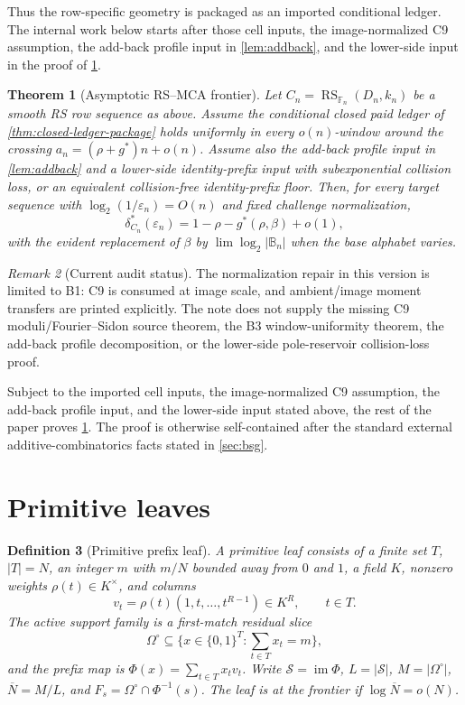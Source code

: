 \documentclass[11pt,a4paper]{amsart}
\numberwithin{equation}{section}
\newtheorem{theorem}{Theorem}[section]
\newtheorem{definition}[theorem]{Definition}
\theoremstyle{remark}
\newtheorem{remark}[theorem]{Remark}
\DeclareMathOperator{\RS}{RS}
\newcommand{\F}{\mathbb F}
\newcommand{\B}{\mathbb B}
\newcommand{\Scal}{\mathcal S}
\newcommand{\OmegaC}{\Omega^{\circ}}
\newcommand{\barN}{\overline N}
\newcommand{\eps}{\varepsilon}
\begin{document}
Thus the row-specific geometry is packaged as an imported conditional ledger.  The internal work below starts after those cell inputs, the image-normalized C9 assumption, the add-back profile input in \cref{lem:addback}, and the lower-side input in the proof of \cref{thm:frontier}.

\begin{theorem}[Asymptotic RS--MCA frontier]\label{thm:frontier}
Let \(C_n=\RS_{\F_n}(D_n,k_n)\) be a smooth RS row sequence as above.  Assume the conditional closed paid ledger of \cref{thm:closed-ledger-package} holds uniformly in every \(o(n)\)-window around the crossing \(a_n=(\rho+g^*)n+o(n)\).  Assume also the add-back profile input in \cref{lem:addback} and a lower-side identity-prefix input with subexponential collision loss, or an equivalent collision-free identity-prefix floor.  Then, for every target sequence with \(\log_2(1/\eps_n)=O(n)\) and fixed challenge normalization,
\[
        \delta_{C_n}^*(\eps_n)
        =1-\rho-g^*(\rho,\beta)+o(1),
\]
with the evident replacement of \(\beta\) by \(\lim\log_2|\B_n|\) when the base alphabet varies.
\end{theorem}

\begin{remark}[Current audit status]\label{rem:current-audit-status}
The normalization repair in this version is limited to B1: C9 is consumed at image scale, and ambient/image moment transfers are printed explicitly.  The note does not supply the missing C9 moduli/Fourier--Sidon source theorem, the B3 window-uniformity theorem, the add-back profile decomposition, or the lower-side pole-reservoir collision-loss proof.
\end{remark}

Subject to the imported cell inputs, the image-normalized C9 assumption, the add-back profile input, and the lower-side input stated above, the rest of the paper proves \cref{thm:frontier}.  The proof is otherwise self-contained after the standard external additive-combinatorics facts stated in \cref{sec:bsg}.

\section{Primitive leaves}

\begin{definition}[Primitive prefix leaf]\label{def:primitive-leaf}
A primitive leaf consists of a finite set \(T\), \(|T|=N\), an integer \(m\) with \(m/N\) bounded away from \(0\) and \(1\), a field \(K\), nonzero weights \(\rho(t)\in K^\times\), and columns
\[
        v_t=\rho(t)(1,t,\ldots,t^{R-1})\in K^R,\qquad t\in T.
\]
The active support family is a first-match residual slice
\[
        \OmegaC\subseteq \{x\in\{0,1\}^{T}:\sum_{t\in T}x_t=m\},
\]
and the prefix map is \(\Phi(x)=\sum_{t\in T}x_tv_t\).  Write \(\Scal=\operatorname{im}\Phi\), \(L=|\Scal|\), \(M=|\OmegaC|\), \(\barN=M/L\), and \(F_s=\OmegaC\cap\Phi^{-1}(s)\).  The leaf is at the frontier if \(\log\barN=o(N)\).
\end{definition}
\end{document}
